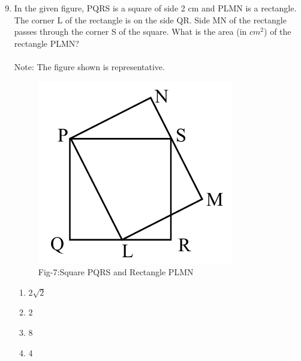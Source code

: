 \documentclass[journal]{IEEEtran}
\theoremstyle{remark}
\begin{document}
\begin{enumerate}[itemsep=1em]
\setcounter{enumi}{8}
\item In the given figure, PQRS is a square of side 2 cm and PLMN is a rectangle. The corner L of the rectangle is on the side QR. Side MN of the rectangle passes through the corner S of the square. What is the area (in $cm^2$) of the rectangle PLMN?\\
\\
Note: The figure shown is representative. 
\begin{figure}[H]
    \centering
    \includegraphics[width=0.4\columnwidth]{figs/fig-7.jpeg}
    \caption*{Fig-7:Square PQRS and Rectangle PLMN}
    \label{fig:7}
\end{figure}
\begin{multicols}{4}
\begin{enumerate}
    \item $2\sqrt{2}$
    \item $2$
    \item 8
    \item 4
\end{enumerate}
\end{multicols}
\end{enumerate}
\newpage
\vspace*{0.25cm}
\end{document}
